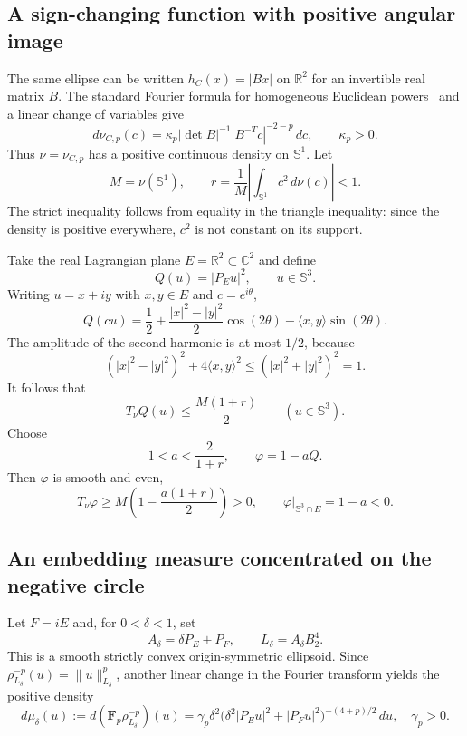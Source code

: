 \documentclass[11pt]{article}
\newcommand{\C}{\mathbb C}
\newcommand{\R}{\mathbb R}
\newcommand{\Sph}{\mathbb S}
\newcommand{\F}{\mathbf F}
\newcommand{\pair}[2]{\langle #1,#2\rangle}
\begin{document}
\subsection{A sign-changing function with positive angular image}

The same ellipse can be written $h_C(x)=|Bx|$ on $\R^2$ for an invertible
real matrix $B$.  The standard Fourier formula for homogeneous Euclidean
powers~\cite[Chapter 3]{Koldobsky} and a linear change of variables give
\begin{equation}\label{eq:nu-density}
 d\nu_{C,p}(c)
 =\kappa_p|\det B|^{-1}|B^{-T}c|^{-2-p}\,dc,
 \qquad \kappa_p>0.
\end{equation}
Thus $\nu=\nu_{C,p}$ has a positive continuous density on $\Sph^1$.
Let
\[
 M=\nu(\Sph^1),
 \qquad
 r=\frac1M\left|\int_{\Sph^1}c^2\,d\nu(c)\right|<1.
\]
The strict inequality follows from equality in the triangle inequality: since
the density is positive everywhere, $c^2$ is not constant on its support.

Take the real Lagrangian plane $E=\R^2\subset\C^2$ and define
\[
 Q(u)=|P_Eu|^2,\qquad u\in\Sph^3.
\]
Writing $u=x+iy$ with $x,y\in E$ and $c=e^{i\theta}$,
\[
 Q(cu)=\frac12+\frac{|x|^2-|y|^2}{2}\cos(2\theta)
                 -\pair{x}{y}\sin(2\theta).
\]
The amplitude of the second harmonic is at most $1/2$, because
\[
 (|x|^2-|y|^2)^2+4\pair{x}{y}^2
 \le (|x|^2+|y|^2)^2=1.
\]
It follows that
\begin{equation}\label{eq:TQ}
 T_\nu Q(u)\le \frac{M(1+r)}2
 \qquad (u\in\Sph^3).
\end{equation}
Choose
\begin{equation}\label{eq:a-choice}
 1<a<\frac{2}{1+r},
 \qquad \varphi=1-aQ.
\end{equation}
Then $\varphi$ is smooth and even,
\begin{equation}\label{eq:witness-signs}
 T_\nu\varphi
 \ge M\left(1-\frac{a(1+r)}2\right)>0,
 \qquad
 \varphi|_{\Sph^3\cap E}=1-a<0.
\end{equation}

\subsection{An embedding measure concentrated on the negative circle}

Let $F=iE$ and, for $0<\delta<1$, set
\[
 A_\delta=\delta P_E+P_F,
 \qquad L_\delta=A_\delta B_2^4.
\]
This is a smooth strictly convex origin-symmetric ellipsoid.  Since
$\rho_{L_\delta}^{-p}(u)=\|u\|_{L_\delta}^{p}$, another linear change in the
Fourier transform yields the positive density
\begin{equation}\label{eq:mu-delta}
 d\mu_\delta(u):=d(\F_p\rho_{L_\delta}^{-p})(u)
 =\gamma_p\delta^2
 \bigl(\delta^2|P_Eu|^2+|P_Fu|^2\bigr)^{-(4+p)/2}\,du,
 \quad \gamma_p>0.
\end{equation}
\end{document}
